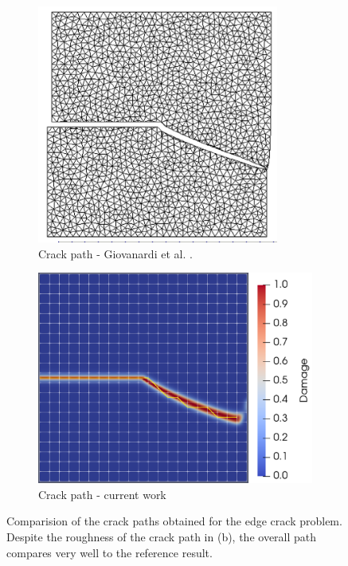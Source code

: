 \begin{figure}[h]
    \begin{subfigure}{.45\textwidth}
      \centering
      \includegraphics[width=0.765\linewidth]{Chapter4/figures/nonplanar/curved_crack_result_bianca.png}
      \caption{Crack path - Giovanardi et al. \cite{giovanardi2017hybrid}.}
      \label{fig:reference result}
    \end{subfigure}%
    \begin{subfigure}{.54\textwidth}
      \centering
      \includegraphics[width=0.83\linewidth]{Chapter4/figures/nonplanar/nonplanar_example.png}
      \caption{Crack path - current work}
      \label{fig:crack_path}
    \end{subfigure}%
      \caption{Comparision of the crack paths obtained for the edge crack problem. Despite the roughness of the crack path in (b), the overall path compares very well to the reference result.} 
      \label{fig:nonplanar_example}
\end{figure}